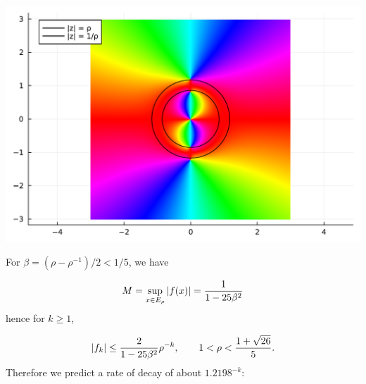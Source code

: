 \documentclass[12pt,a4paper]{article}
\begin{document}
\includegraphics[width=\linewidth]{jl_hpkPoK/OP_methods_test_27_1.pdf}

For $\beta = (\rho - \rho^{-1})/2 < 1/5$, we have

\[
M =  \sup_{x \in  E_{\rho}} |f(x)| = {1 \over 1 - 25 \beta^2}
\]
hence for $k \geq 1$,

\[
\vert f_k \vert \leq {2 \over   1 - 25 \beta^2} \rho^{-k}, \qquad 1 < \rho <  { 1 + \sqrt{26} \over 5 }.
\]
Therefore we predict a rate of decay of about $1.2198^{-k}$:
\end{document}
